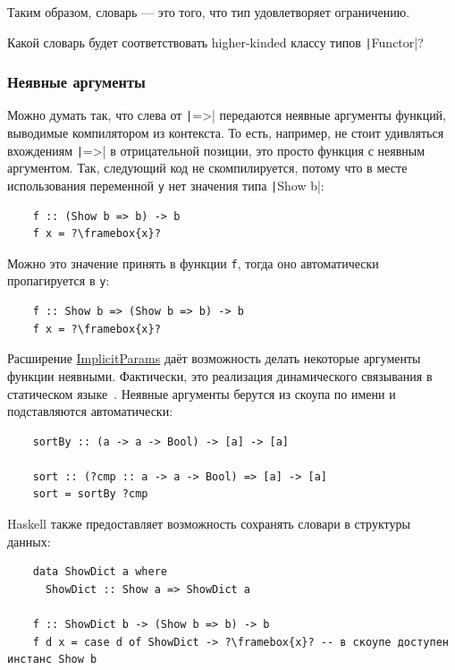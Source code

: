Таким образом, словарь --- это  того, что тип удовлетворяет ограничению.

\begin{task}
    Какой словарь будет соответствовать higher-kinded классу типов \texttt|Functor|?
\end{task}

\subsubsection{Неявные аргументы}

Можно думать так, что слева от \texttt|=>| передаются неявные аргументы функций, выводимые компилятором из контекста.
То есть, например, не стоит удивляться вхождениям \texttt|=>| в отрицательной позиции, это просто функция с неявным аргументом.
Так, следующий код не скомпилируется, потому что в месте использования переменной \texttt{y} нет значения типа \texttt|Show b|:
\begin{verbatim}
    f :: (Show b => b) -> b
    f x = ?\framebox{x}?
\end{verbatim}
Можно это значение принять в функции \texttt{f}, тогда оно автоматически пропагируется в \texttt{y}:
\begin{verbatim}
    f :: Show b => (Show b => b) -> b
    f x = ?\framebox{x}?
\end{verbatim}

Расширение \href{https://ghc.gitlab.haskell.org/ghc/doc/users_guide/exts/implicit_parameters.html}{ImplicitParams} даёт возможность делать некоторые аргументы функции неявными.
Фактически, это реализация динамического связывания в статическом языке~\cite{lewis2000implicit}. %
Неявные аргументы берутся из скоупа по имени и подставляются автоматически:
\begin{verbatim}
    sortBy :: (a -> a -> Bool) -> [a] -> [a]

    sort :: (?cmp :: a -> a -> Bool) => [a] -> [a]
    sort = sortBy ?cmp
\end{verbatim}

Haskell также предоставляет возможность сохранять словари в структуры данных:
\begin{verbatim}
    data ShowDict a where
      ShowDict :: Show a => ShowDict a

    f :: ShowDict b -> (Show b => b) -> b
    f d x = case d of ShowDict -> ?\framebox{x}? -- в скоупе доступен инстанс Show b
\end{verbatim}

